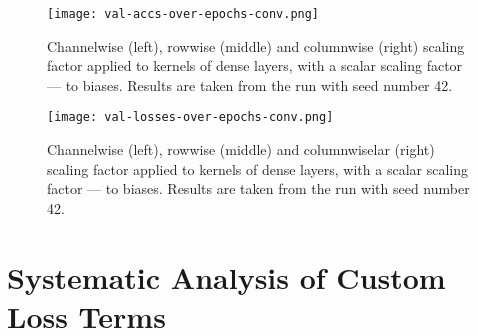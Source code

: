 \begin{figure}[h!]
  \centering
  \texttt{[image: val-accs-over-epochs-conv.png]}
  \caption{Channelwise (left), rowwise (middle) and columnwise (right) scaling factor applied to kernels of dense layers, with a scalar scaling factor — to biases. Results are taken from the run with seed number 42.}
  \label{fig:val-accs-over-epochs-dense}
\end{figure}

\begin{figure}[h!]
  \centering
  \texttt{[image: val-losses-over-epochs-conv.png]}
  \caption{Channelwise (left), rowwise (middle) and columnwiselar (right) scaling factor applied to kernels of dense layers, with a scalar scaling factor — to biases. Results are taken from the run with seed number 42.}
  \label{fig:val-losses-over-epochs-dense}
\end{figure}

\section{Systematic Analysis of Custom Loss Terms}
\label{sec:dataset}

